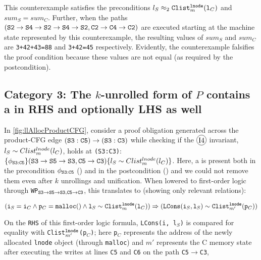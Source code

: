 This counterexample satisfies the preconditions $l_S\approx_2{\tt Clist}^{{\tt lnode}}_{m}({\tt l}_C)$
and $sum_S=sum_C$. Further, when the
paths $({\tt S2\rightarrow S4\rightarrow S2\rightarrow S4\rightarrow S2}, {\tt C2\rightarrow C4\rightarrow C2})$
are executed starting at the machine state represented by this counterexample, the resulting
values of $sum_S$ and $sum_C$ are {\tt 3+42+43=88} and {\tt 3+42=45} respectively. Evidently, the
counterexample falsifies the proof condition because these values are not equal (as required by the postcondition).
\vspace{-6px}
\subsection{Category 3: The $k$-unrolled form of $P$ contains a \recursiveRelation{} in RHS and optionally LHS as well}
\label{sec:cat3}
In \cref{fig:llAllocProductCFG}, consider a proof obligation generated
across the product-CFG edge ${\tt (S3:C5) \rightarrow (S3:C3)}$
while checking if the {\small $\circled{I4}$} invariant, $l_{S}\sim{}Clist^{lnode}_{m}(l_{C})$,
holds at {\tt (S3:C3)}:
$\{\phi_{{\tt S3:C5}}\} ({\tt S3\rightarrow S5\rightarrow S3}, \\ {\tt C5\rightarrow C3}) \{l_{S}\sim{}Clist^{lnode}_{m}(l_{C})\}$.
Here, a \recursiveRelation{} is present both in the precondition $\phi_{{\tt S3:C5}}$ ({\small {}})
and in the postcondition ({\small {}}) and we could
not remove them even after $k$ unrollings and unification.
When lowered to first-order logic
through {\tt WP$_{{\tt S3\rightarrow S5\rightarrow S3},{\tt C5\rightarrow C3}}$}, this translates to (showing only relevant
relations):
\vspace{-5px}
\begin{small}
\begin{equation}\label{eqn:ex1cat3}
({\tt i}_S={\tt i}_C \land {\tt p}_C={\tt malloc()} \land {\tt l}_S \sim{} {\tt Clist}_m^{{\tt lnode}}({\tt l}_C)) \Rightarrow ({\tt LCons}({\tt i}_S, {\tt l}_S) \sim{} {\tt Clist}_{m'}^{{\tt lnode}}({\tt p}_C))
\end{equation}
\end{small}
On the {\tt RHS} of this first-order logic formula, {\tt LCons(i, l$_S$)} is compared for
equality with {\tt Clist$_{m'}^{{\tt lnode}}$(p$_C$)}; here {\tt p$_C$}
represents the address of the newly allocated {\tt lnode} object (through {\tt malloc}) and $m'$
represents the C memory state after executing the writes at lines
{\tt C5} and {\tt C6} on the path {\tt C5$\rightarrow$C3},
